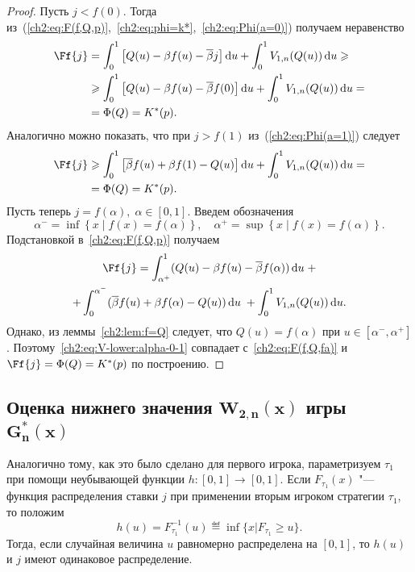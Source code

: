 {\begin{proof}
  Пусть $j < f(0)$.
  Тогда из~(\ref{ch2:eq:F(f,Q,p)},~\ref{ch2:eq:phi=k*},~\ref{ch2:eq:Phi(a=0)}) получаем неравенство
  \begin{align*}
    \Ff{j} 
    &= \int_0^1 \left[ 
      Q(u) - \Co f(u) - \DCo j 
    \right] \di u +
    \int_0^1 V_{1,n}(Q(u)) \di u \geq \\
    &\geq \int_0^1 \left[ 
      Q(u) - \Co f(u) - \DCo f(0) 
    \right] \di u + \int_0^1 V_{1,n}(Q(u)) \di u = \\
    &= \Phi(Q) = K^*(p).
  \end{align*}
  Аналогично можно показать, что при $j > f(1)$ из~(\ref{ch2:eq:Phi(a=1)}) следует
  \begin{align*}
    \Ff{j} 
    &\geq \int_0^1 \left[ 
      \DCo f(u) + \Co f(1) - Q(u) 
    \right] \di u + \int_0^1 V_{1,n}(Q(u)) \di u = \\
    &= \Phi(Q) = K^*(p).
  \end{align*}
  Пусть теперь $j = f(\alpha), \; \alpha \in [0, 1]$. Введем обозначения
  \[
    \alpha^- = \inf \left\{ x \;|\; f(x) = f(\alpha) \right\}, \quad \alpha^+ =
    \sup \left\{ x \;|\; f(x) = f(\alpha) \right\}.
  \]
  Подстановкой в~\eqref{ch2:eq:F(f,Q,p)} получаем
  \begin{multline}\label{ch2:eq:V-lower:alpha-0-1}
    \Ff{j} =
    \int_{\alpha^+}^1  (Q(u) - \Co f(u) - \DCo f(\alpha)) \di u \; + \\
    + \int_0^{\alpha^-} (\DCo f(u) + \Co f(\alpha) - Q(u)) \di u \; + \int_0^1
    V_{1,n}(Q(u)) \di u.
  \end{multline}
  Однако, из леммы~\ref{ch2:lem:f=Q} следует, что $Q(u) = f(\alpha)$ при $u \in [\alpha^-, \alpha^+]$.
  Поэтому~\eqref{ch2:eq:V-lower:alpha-0-1} совпадает с~\eqref{ch2:eq:F(f,Q,fa)} и $\Ff{j} = \Phi(Q) = K^*(p)$ по построению.
\end{proof}

\subsection{Оценка нижнего значения $\mathbf{W_{2,n}(x)}$ игры $\mathbf{G^*_n(x)}$}
\label{ch2:sec:-dual-game}

Аналогично тому, как это было сделано для первого игрока, параметризуем $\tau_1$ при помощи неубывающей функции $h: [0, 1] \rightarrow [0, 1]$.
Если $F_{\tau_1}(x)$ "--- функция распределения ставки $j$ при применении вторым игроком стратегии $\tau_1$, то положим
\begin{equation*}
  h(u) = F^{-1}_{\tau_1}(u) \eqdef \inf \{ x | F_{\tau_1} \geq u \}.
\end{equation*}
Тогда, если случайная величина $u$ равномерно распределена на $[0, 1]$, то $h(u)$ и $j$ имеют одинаковое распределение.

}
